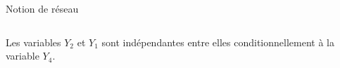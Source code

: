 \documentclass[11pt]{bredelebeamer}
\begin{document}
\begin{frame}{Notion de réseau}
\begin{columns}
\begin{column}{0.55\linewidth}
\begin{flushleft}
 \vspace{-0.5cm}
 Les variables $Y_2$ et $Y_1$ sont indépendantes entre elles conditionnellement à la variable $Y_4$.
\end{flushleft}

\end{column}

\end{columns}


\end{frame}



\end{document}
